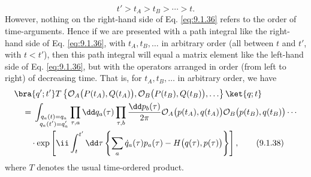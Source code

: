 \begin{equation}
  t'>t_A>t_B>\cdots>t.
  \tag{9.1.37}\label{eq:9.1.37}
\end{equation}
However, nothing on the right-hand side of Eq. \eqref{eq:9.1.36} refers to the order
of time-arguments. Hence if we are presented with a path integral like the
right-hand side of Eq. \eqref{eq:9.1.36}, with $t_A,t_B,\ldots$ in arbitrary order
(all between $t$ and $t'$, with $t<t'$), then this path integral will equal
a matrix element like the left-hand side of Eq. \eqref{eq:9.1.36}, but with the
operators arranged in order (from left to right) of decreasing time. That is,
for $t_A,t_B,\ldots$ in arbitrary order, we have
\begin{align}
  &\bra{q';t'}T\left\{\mathcal{O}_A\bigl(P(t_A),Q(t_A)\bigr),
  \mathcal{O}_B\bigl(P(t_B),Q(t_B)\bigr),\ldots\right\}\ket{q;t}
  \notag\\
  &\quad={}
  \int_{\substack{q_a(t)=q_a\\q_a(t')=q'_a}}
  \prod_{\tau,a}\dd q_a(\tau)\prod_{\tau,b}\frac{\dd p_b(\tau)}{2\pi}
  \mathcal{O}_A\bigl(p(t_A),q(t_A)\bigr)
  \mathcal{O}_B\bigl(p(t_B),q(t_B)\bigr)\cdots
  \notag\\
  &\qquad\cdot\exp\left[\ii\int_t^{t'}\dd\tau
  \left\{\sum_a\dot q_a(\tau)p_a(\tau)
  -H\bigl(q(\tau),p(\tau)\bigr)\right\}\right],
  \tag{9.1.38}\label{eq:9.1.38}
\end{align}
where $T$ denotes the usual time-ordered product.

